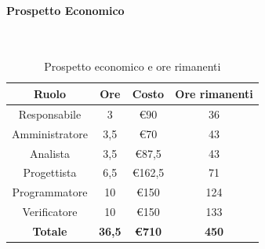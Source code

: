 \documentclass{article}
\begin{document}
                \paragraph{Prospetto Economico}\mbox{}\\
                \begin{table}[H]
                    \centering
                    \begin{tabular}{|c|c|c|c|}
                    \hline
                    \textbf{Ruolo}  & \textbf{Ore}  & \textbf{Costo} & \textbf{Ore rimanenti} \\ \hline
                    Responsabile    & 3             & €90            & 36                     \\ \hline
                    Amministratore  & 3,5           & €70            & 43                   \\ \hline
                    Analista        & 3,5           & €87,5          & 43                   \\ \hline
                    Progettista     & 6,5           & €162,5         & 71                   \\ \hline
                    Programmatore   & 10            & €150           & 124                    \\ \hline
                    Verificatore    & 10            & €150           & 133                    \\ \hline
                    \textbf{Totale} & \textbf{36,5} & \textbf{\euro710}   & \textbf{450}         \\ \hline
                    \end{tabular}
                    \caption{Prospetto economico e ore rimanenti}
                \end{table}
\end{document}
